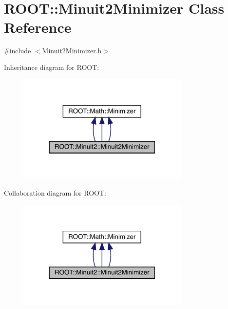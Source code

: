 \hypertarget{classROOT_1_1Minuit2_1_1Minuit2Minimizer}{}\section{R\+O\+OT\+:\+:Minuit2\+Minimizer Class Reference}
\label{classROOT_1_1Minuit2_1_1Minuit2Minimizer}


{\ttfamily \#include $<$Minuit2\+Minimizer.\+h$>$}



Inheritance diagram for R\+O\+OT\+:
\nopagebreak
\begin{figure}[H]
\begin{center}
\leavevmode
\includegraphics[width=242pt]{de/d16/classROOT_1_1Minuit2_1_1Minuit2Minimizer__inherit__graph}
\end{center}
\end{figure}


Collaboration diagram for R\+O\+OT\+:
\nopagebreak
\begin{figure}[H]
\begin{center}
\leavevmode
\includegraphics[width=242pt]{d6/d69/classROOT_1_1Minuit2_1_1Minuit2Minimizer__coll__graph}
\end{center}
\end{figure}
